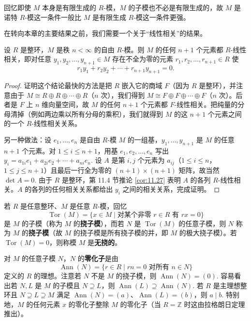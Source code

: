 回忆即使 \(M\) 本身是有限生成的 \(R\)-模，\(M\) 的子模也不必是有限生成的，故 \(M\) 是诺特 \(R\)-模这一条件一般比 \(M\) 是有限生成 \(R\)-模这一条件更强。

在转向本章的主要结果之前，我们需要一个关于“线性相关”的结果。

\begin{proposition}\label{pro:12.3}
设 \(R\) 是整环，\(M\) 是秩 \(n < \infty\) 的自由 \(R\)-模。则 \(M\) 的任何 \(n+1\) 个元素都 \(R\)-线性相关，即对任意 \(y_1, y_2, \ldots, y_{n+1} \in M\) 存在不全为零的元素 \(r_1, r_2, \ldots, r_{n+1} \in R\) 使
\[
r_1y_1+r_2y_2+\cdots+r_{n+1}y_{n+1} = 0.
\]
\end{proposition}

\begin{proof}
证明这个结论最快的方法是把 \(R\) 嵌入它的商域 \(F\)（因为 \(R\) 是整环），并注意由于 \(M \cong R \oplus R \oplus \cdots \oplus R\)（\(n\) 次），我们得到 \(M \cong F \oplus F \oplus \cdots \oplus F\)（\(n\) 次）。后者是 \(F\) 上 \(n\) 维向量空间，故 \(M\) 的任何 \(n+1\) 个元素都 \(F\)-线性相关。把纯量的分母清掉（例如两边乘以所有分母的乘积），我们就得到 \(M\) 的这 \(n+1\) 个元素之间的一个 \(R\)-线性相关关系。

另一种做法：设 \(e_1, \ldots, e_n\) 是自由 \(R\)-模 \(M\) 的一组基，\(y_1, \ldots, y_{n+1}\) 是 \(M\) 的任意 \(n+1\) 个元素。对 \(1 \leq i \leq n+1\)，用基 \(e_1, e_2, \ldots, e_n\) 写出 \(y_i = a_{1i}e_1+a_{2i}e_2+\cdots+a_{ni}e_n\). 设 \(A\) 是第 \(i, j\) 个元素为 \(a_{ij}\)（\(1 \leq i \leq n\)，\(1 \leq j \leq n+1\)）且最后一行全为零的 \((n+1) \times (n+1)\) 矩阵，故当然 \(\det A = 0\). 由于 \(R\) 是整环，第 11.4 节推论 \ref{cor:11.27} 表明 \(A\) 的各列 \(R\)-线性相关。\(A\) 的各列的任何相关关系都给出 \(y_i\) 之间的相关关系，完成证明。
\end{proof}

若 \(R\) 是任意整环、\(M\) 是任意 \(R\)-模，回忆
\[
\operatorname{Tor}(M) = \{x \in M \mid \text{对某个非零 } r \in R \text{ 有 } rx = 0\}
\]
是 \(M\) 的子模（称为 \(M\) 的\textbf{挠子模}），而若 \(N\) 是 \(\operatorname{Tor}(M)\) 的任意子模，则 \(N\) 称为 \(M\) 的\textbf{挠子模}（故 \(M\) 的挠子模是所有挠子模的并，即 \(M\) 的极大挠子模）。若 \(\operatorname{Tor}(M) = 0\)，则称模 \(M\) 是\textbf{无挠的}。

对 \(M\) 的任意子模 \(N\)，\(N\) 的\textbf{零化子}是由
\[
\operatorname{Ann}(N) = \{r \in R \mid rn = 0 \text{ 对所有 } n \in N\}
\]
定义的 \(R\) 的理想。注意若 \(N\) 不是 \(M\) 的挠子模，则 \(\operatorname{Ann}(N) = (0)\). 容易看出若 \(N, L\) 是 \(M\) 的子模且 \(N \supseteq L\)，则 \(\operatorname{Ann}(L) \supseteq \operatorname{Ann}(N)\). 若 \(R\) 是主理想整环且 \(N \supseteq L \supseteq M\) 满足 \(\operatorname{Ann}(N) = (a)\)、\(\operatorname{Ann}(L) = (b)\)，则 \(a \mid b\). 特别地，\(M\) 的任何元素 \(x\) 的零化子整除 \(M\) 的零化子（当 \(R = \mathbb{Z}\) 时这由拉格朗日定理推出）。

